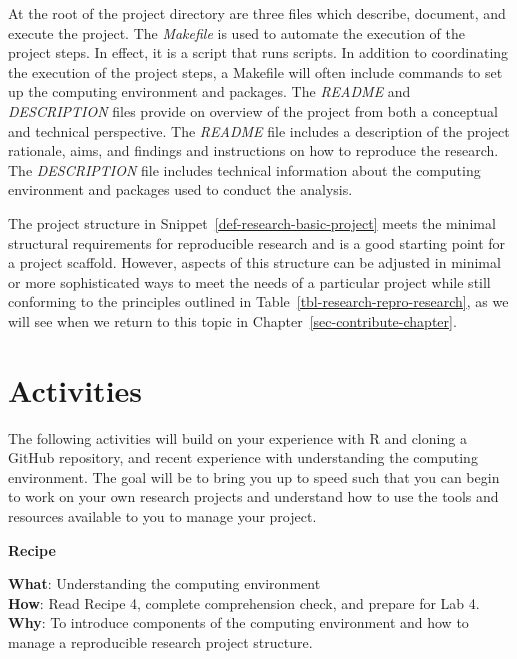 \documentclass[
  letterpaper,
  krantz1]{latex/krantz-mod}
\theoremstyle{definition}
\theoremstyle{definition}
\theoremstyle{remark}
\begin{document}
At the root of the project directory are three files which describe,
document, and execute the project. The \emph{Makefile} is used to
automate the execution of the project steps. In effect, it is a script
that runs scripts. In addition to coordinating the execution of the
project steps, a Makefile will often include commands to set up the
computing environment and packages. The \emph{README} and
\emph{DESCRIPTION} files provide on overview of the project from both a
conceptual and technical perspective. The \emph{README} file includes a
description of the project rationale, aims, and findings and
instructions on how to reproduce the research. The \emph{DESCRIPTION}
file includes technical information about the computing environment and
packages used to conduct the analysis.

The project structure in Snippet~\ref{def-research-basic-project} meets
the minimal structural requirements for reproducible research and is a
good starting point for a project scaffold. However, aspects of this
structure can be adjusted in minimal or more sophisticated ways to meet
the needs of a particular project while still conforming to the
principles outlined in Table~\ref{tbl-research-repro-research}, as we
will see when we return to this topic in
Chapter~\ref{sec-contribute-chapter}.

\section*{Activities}\label{activities-2}


The following activities will build on your experience with R and
cloning a GitHub repository, and recent experience with understanding
the computing environment. The goal will be to bring you up to speed
such that you can begin to work on your own research projects and
understand how to use the tools and resources available to you to manage
your project.

\begin{tcolorbox}[enhanced jigsaw, leftrule=.75mm, colframe=quarto-callout-color-frame, left=2mm, colback=white, toprule=.15mm, breakable, arc=.35mm, opacityback=0, bottomrule=.15mm, rightrule=.15mm]

\textbf{ Recipe}

\textbf{What}: Understanding the computing environment\\
\textbf{How}: Read Recipe 4, complete comprehension check, and prepare
for Lab 4.\\
\textbf{Why}: To introduce components of the computing environment and
how to manage a reproducible research project structure.

\end{tcolorbox}
\end{document}

